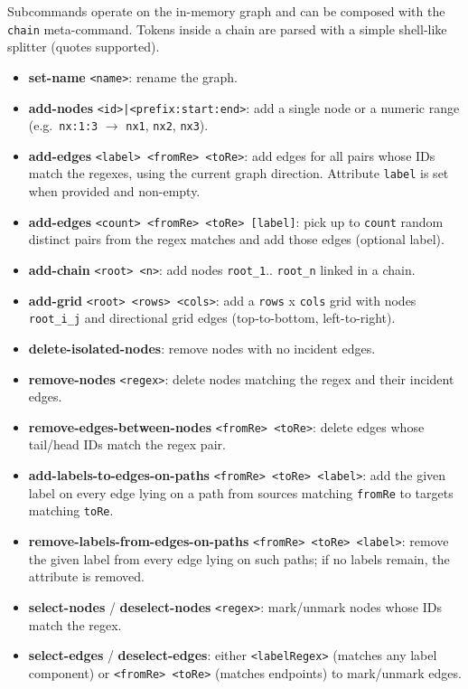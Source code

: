 \documentclass[11pt]{article}
\begin{document}
Subcommands operate on the in-memory graph and can be composed with the \texttt{chain} meta-command. Tokens inside a chain are parsed with a simple shell-like splitter (quotes supported).
\begin{itemize}[leftmargin=*]
  \item \textbf{set-name} \texttt{<name>}: rename the graph.
  \item \textbf{add-nodes} \texttt{<id>|<prefix:start:end>}: add a single node or a numeric range (e.g.\ \texttt{nx:1:3} $\rightarrow$ \texttt{nx1}, \texttt{nx2}, \texttt{nx3}).
  \item \textbf{add-edges} \texttt{<label> <fromRe> <toRe>}: add edges for all pairs whose IDs match the regexes, using the current graph direction. Attribute \texttt{label} is set when provided and non-empty.
  \item \textbf{add-edges} \texttt{<count> <fromRe> <toRe> [label]}: pick up to \texttt{count} random distinct pairs from the regex matches and add those edges (optional label).
  \item \textbf{add-chain} \texttt{<root> <n>}: add nodes \texttt{root\_1}.. \texttt{root\_n} linked in a chain.
  \item \textbf{add-grid} \texttt{<root> <rows> <cols>}: add a \texttt{rows} x \texttt{cols} grid with nodes \texttt{root\_i\_j} and directional grid edges (top-to-bottom, left-to-right).
  \item \textbf{delete-isolated-nodes}: remove nodes with no incident edges.
  \item \textbf{remove-nodes} \texttt{<regex>}: delete nodes matching the regex and their incident edges.
  \item \textbf{remove-edges-between-nodes} \texttt{<fromRe> <toRe>}: delete edges whose tail/head IDs match the regex pair.
  \item \textbf{add-labels-to-edges-on-paths} \texttt{<fromRe> <toRe> <label>}: add the given label on every edge lying on a path from sources matching \texttt{fromRe} to targets matching \texttt{toRe}.
  \item \textbf{remove-labels-from-edges-on-paths} \texttt{<fromRe> <toRe> <label>}: remove the given label from every edge lying on such paths; if no labels remain, the attribute is removed.
  \item \textbf{select-nodes} / \textbf{deselect-nodes} \texttt{<regex>}: mark/unmark nodes whose IDs match the regex.
  \item \textbf{select-edges} / \textbf{deselect-edges}: either \texttt{<labelRegex>} (matches any label component) or \texttt{<fromRe> <toRe>} (matches endpoints) to mark/unmark edges.

\end{itemize}
\end{document}
